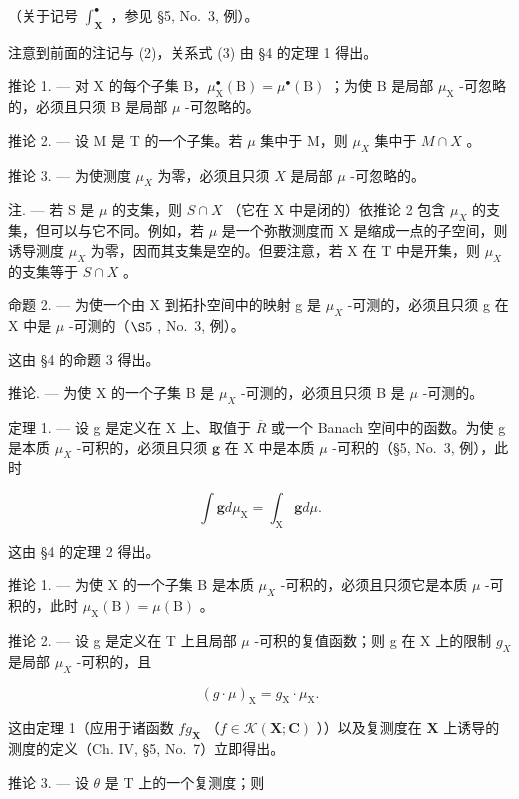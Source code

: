 （关于记号 \(\int_{\mathbf{X}}^{\bullet}\) ，参见 §5, No.~3, 例）。

注意到前面的注记与 (2)，关系式 (3) 由 §4 的定理 1 得出。

推论 1. --- 对 X 的每个子集 B，\(\mu_{\mathrm{X}}^{\bullet}(\mathrm{B}) = \mu^{\bullet}(\mathrm{B})\) ；为使 B 是局部 \(\mu_{\mathrm{X}}\) -可忽略的，必须且只须 B 是局部 \(\mu\) -可忽略的。

推论 2. --- 设 M 是 T 的一个子集。若 \(\mu\) 集中于 M，则 \(\mu_{X}\) 集中于 \(M \cap X\) 。

推论 3. --- 为使测度 \(\mu_{X}\) 为零，必须且只须 \(X\) 是局部 \(\mu\) -可忽略的。

注. --- 若 S 是 \(\mu\) 的支集，则 \(S \cap X\) （它在 X 中是闭的）依推论 2 包含 \(\mu_{X}\) 的支集，但可以与它不同。例如，若 \(\mu\) 是一个弥散测度而 X 是缩成一点的子空间，则诱导测度 \(\mu_{X}\) 为零，因而其支集是空的。但要注意，若 X 在 T 中是开集，则 \(\mu_{X}\) 的支集等于 \(S \cap X\) 。

命题 2. --- 为使一个由 X 到拓扑空间中的映射 g 是 \(\mu_{X}\) -可测的，必须且只须 g 在 X 中是 \(\mu\) -可测的（\(\S5\) , No.~3, 例）。

这由 §4 的命题 3 得出。

推论. --- 为使 X 的一个子集 B 是 \(\mu_{X}\) -可测的，必须且只须 B 是 \(\mu\) -可测的。

定理 1. --- 设 g 是定义在 X 上、取值于 \(\overline{R}\) 或一个 Banach 空间中的函数。为使 g 是本质 \(\mu_{X}\) -可积的，必须且只须 \(\mathbf{g}\) 在 X 中是本质 \(\mu\) -可积的（§5, No.~3, 例），此时

\[
\int \mathbf {g} d \mu_ {\mathrm{X}} = \int_ {\mathrm{X}} \mathbf {g} d \mu .\tag{4}
\]

这由 §4 的定理 2 得出。

推论 1. --- 为使 X 的一个子集 B 是本质 \(\mu_{X}\) -可积的，必须且只须它是本质 \(\mu\) -可积的，此时 \(\mu_{\mathrm{X}}(\mathrm{B}) = \mu(\mathrm{B})\) 。

推论 2. --- 设 g 是定义在 T 上且局部 \(\mu\) -可积的复值函数；则 g 在 X 上的限制 \(g_{X}\) 是局部 \(\mu_{X}\) -可积的，且

\[
(g \cdot \mu) _ {\mathrm{X}} = g _ {\mathrm{X}} \cdot \mu_ {\mathrm{X}}.\tag{5}
\]

这由定理 1（应用于诸函数 \(fg_{\mathbf{X}}\) （\(f \in \mathcal{K}(\mathbf{X}; \mathbf{C})\) ））以及复测度在 \(\mathbf{X}\) 上诱导的测度的定义（Ch. IV, §5, No.~7）立即得出。

推论 3. --- 设 \(\theta\) 是 T 上的一个复测度；则

